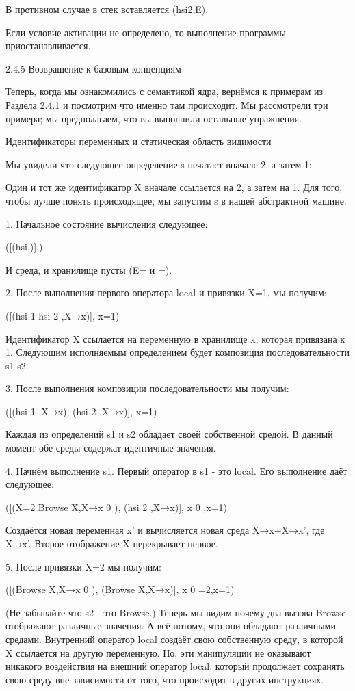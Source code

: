 В противном случае в стек вставляется (hsi2,E).

Если условие активации не определено, то выполнение программы приостанавливается.

2.4.5 Возвращение к базовым концепциям

Теперь, когда мы ознакомились с семантикой ядра, вернёмся к примерам из Раздела 2.4.1 и посмотрим что именно там происходит. Мы рассмотрели три примера; мы предполагаем, что вы выполнили остальные упражнения.

Идентификаторы переменных и статическая область видимости

Мы увидели что следующее определение s печатает вначале 2, а затем 1:

Один и тот же идентификатор X вначале ссылается на 2, а затем на 1. Для того, чтобы лучше понять происходящее, мы запустим s в нашей абстрактной машине.

1. Начальное состояние вычисления следующее:

([(hsi,)],)

И среда, и хранилище пусты (E= и =).

2. После выполнения первого оператора local и привязки X=1, мы получим:

([(hsi
1
hsi
2
,{X→x})],
{x=1})

Идентификатор X ссылается на переменную в хранилище x, которая привязана к 1. Следующим исполняемым определением будет композиция последовательности s1 s2.

3. После выполнения композиции последовательности мы получим:

([(hsi
1
,{X→x}), (hsi
2
,{X→x})],
{x=1})

Каждая из определений s1 и s2 обладает своей собственной средой. В данный момент обе среды содержат идентичные значения.

4. Начнём выполнение s1. Первый оператор в s1 - это local. Его выполнение даёт следующее:

([(X=2 {Browse X},{X→x
0
}), (hsi
2
,{X→x})],
{x
0
,x=1})

Создаётся новая переменная x' и вычисляется новая среда {X→x}+{X→x'}, где {X→x'}. Второе отображение X перекрывает первое.

5. После привязки X=2 мы получим:

([({Browse X},{X→x
0
}), ({Browse X},{X→x})],
{x
0
=2,x=1})

(Не забывайте что s2 - это Browse.) Теперь мы видим почему два вызова Browse отображают различные значения. А всё потому, что они обладают различными средами. Внутренний оператор local создаёт свою собственную среду, в которой X ссылается на другую переменную. Но, эти манипуляции не оказывают никакого воздействия на внешний оператор local, который продолжает сохранять свою среду вне зависимости от того, что происходит в других инструкциях.


